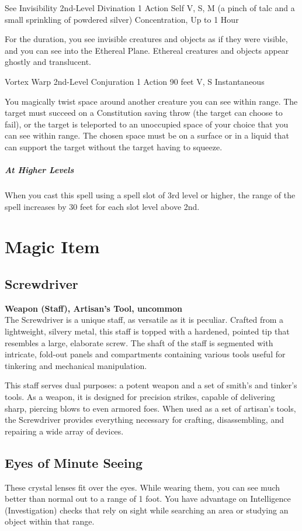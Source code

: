 {\DndSpellHeader
  {See Invisibility}
  {2nd-Level Divination}
  {1 Action}
  {Self}
  {V, S, M (a pinch of talc and a small sprinkling of powdered silver)}
  {Concentration, Up to 1 Hour}
  
For the duration, you see invisible creatures and objects as if they were visible, and you can see into the Ethereal Plane. Ethereal creatures and objects appear ghostly and translucent.

\DndSpellHeader
  {Vortex Warp}
  {2nd-Level Conjuration}
  {1 Action}
  {90 feet}
  {V, S}
  {Instantaneous}
  
You magically twist space around another creature you can see within range. The target must succeed on a Constitution saving throw (the target can choose to fail), or the target is teleported to an unoccupied space of your choice that you can see within range. The chosen space must be on a surface or in a liquid that can support the target without the target having to squeeze.

\subparagraph*{At Higher Levels} When you cast this spell using a spell slot of 3rd level or higher, the range of the spell increases by 30 feet for each slot level above 2nd.

\section*{Magic Item}
\subsection*{Screwdriver}
\textbf{Weapon (Staff), Artisan's Tool, uncommon}\\
The Screwdriver is a unique staff, as versatile as it is peculiar. Crafted from a lightweight, silvery metal, this staff is topped with a hardened, pointed tip that resembles a large, elaborate screw. The shaft of the staff is segmented with intricate, fold-out panels and compartments containing various tools useful for tinkering and mechanical manipulation.

This staff serves dual purposes: a potent weapon and a set of smith's and tinker's tools. As a weapon, it is designed for precision strikes, capable of delivering sharp, piercing blows to even armored foes. When used as a set of artisan's tools, the Screwdriver provides everything necessary for crafting, disassembling, and repairing a wide array of devices.
\subsection*{Eyes of Minute Seeing}
These crystal lenses fit over the eyes. While wearing them, you can see much better than normal out to a range of 1 foot. You have advantage on Intelligence (Investigation) checks that rely on sight while searching an area or studying an object within that range.

}
